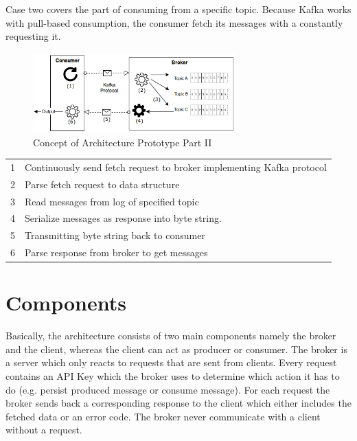 Case two covers the part of consuming from a specific topic. Because Kafka works with 
pull-based consumption, the consumer fetch its messages with a constantly requesting it. 

\begin{figure}[H]
    \centering
   \includegraphics[width=0.7\textwidth]{images/concept_consumer.png}
    \caption{Concept of Architecture Prototype Part II}
    \label{fig:concept-consumer}
\end{figure}

\begin{table}[h]
\begin{tabular}{ll}
1  & Continuously send fetch request to broker implementing Kafka protocol \\
2  & Parse fetch request to data structure                                 \\
3  & Read messages from log of specified topic                             \\
4  & Serialize messages as response into byte string.                      \\
5  & Transmitting byte string back to consumer                             \\
6  & Parse response from broker to get messages                           
\end{tabular}
\end{table}

\section{Components}
Basically, the architecture consists of two main components namely the broker and
the client, whereas the client can act as producer or consumer. The broker is a
server which only reacts to requests that are sent from clients. Every request
contains an API Key which the broker uses to determine which action it has to
do (e.g. persist produced message or consume message). For each request the
broker sends back a corresponding response to the client which either includes
the fetched data or an error code. The broker never communicate with a
client without a request.


